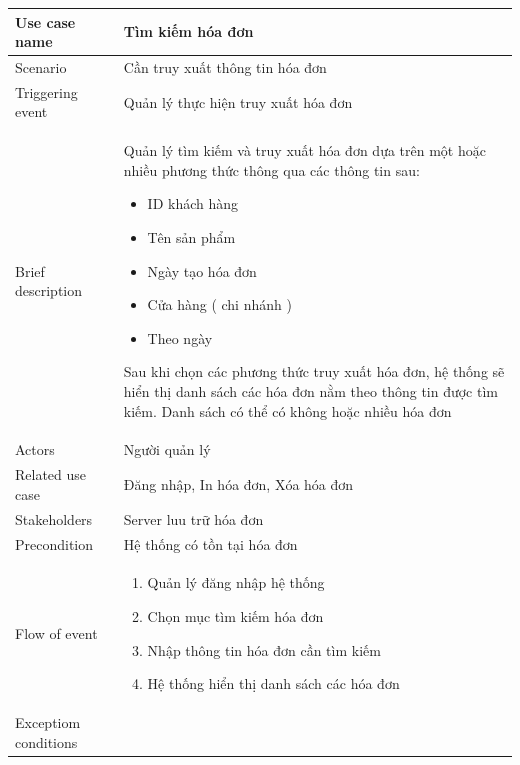 \documentclass{article}
\begin{document}
\begin{tabular}{|m{4cm}|m{12cm}|}
		\hline
		Use case name & Tìm kiếm hóa đơn\\
		\hline
		Scenario & Cần truy xuất thông tin hóa đơn\\
		\hline
		Triggering event & Quản lý thực hiện truy xuất hóa đơn\\
		\hline
		Brief description & Quản lý tìm kiếm và truy xuất hóa đơn dựa trên một hoặc nhiều phương thức thông  qua các thông tin sau: 
		\begin{itemize}
			\item ID khách hàng
			\item Tên sản phẩm
			\item Ngày tạo hóa đơn
			\item Cửa hàng ( chi nhánh )
			\item Theo ngày 
		\end{itemize}				
		Sau khi chọn các phương thức truy xuất hóa đơn, hệ thống sẽ hiển thị danh sách các hóa đơn nằm theo thông tin được tìm kiếm. Danh sách có thể có không hoặc nhiều hóa đơn\\
		\hline
		 Actors & Người quản lý\\
		\hline
		Related use case & Đăng nhập, In hóa đơn, Xóa hóa đơn\\
		\hline
		Stakeholders & Server luu trữ hóa đơn\\
		\hline
		Precondition & Hệ thống có tồn tại hóa đơn\\
		\hline
		Flow of event & 
			\begin{enumerate}
				\item Quản lý đăng nhập hệ thống
				\item Chọn mục tìm kiếm hóa đơn
				\item Nhập thông tin hóa đơn cần tìm kiếm
				\item Hệ thống hiển thị danh sách các hóa đơn
			\end{enumerate}\\
		\hline
		Exceptiom conditions & \\
		\hline
\end{tabular}		
	
\end{document}
